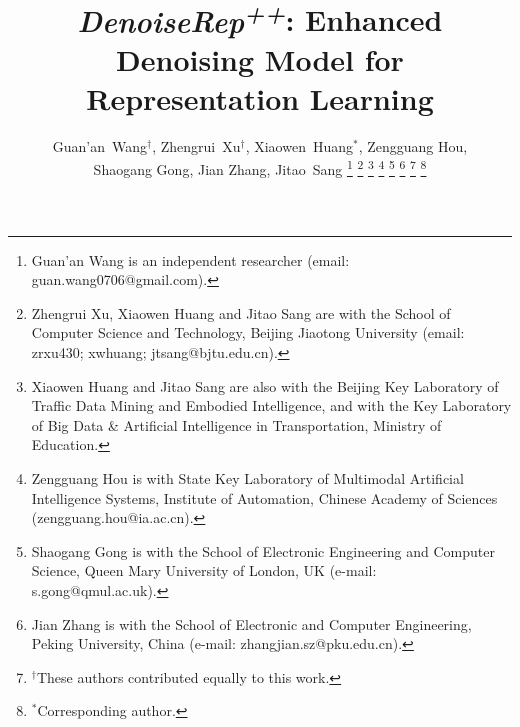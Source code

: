 \documentclass[conference]{IEEEtran}
\begin{document}
\title{\textit{DenoiseRep\textsuperscript{++}}: Enhanced Denoising Model for\\ Representation Learning\\}


\author{Guan'an~Wang$^{\dagger}$,
        Zhengrui~Xu$^{\dagger}$,
        Xiaowen~Huang$^{\ast}$,
        Zengguang Hou,\\
        Shaogang Gong,
        Jian Zhang,
        Jitao~Sang
\thanks{Guan’an Wang is an independent researcher (email: guan.wang0706@gmail.com).}%
\thanks{Zhengrui Xu, Xiaowen Huang and Jitao Sang are with the School of Computer Science and Technology, Beijing Jiaotong University (email: {zrxu430; xwhuang; jtsang}@bjtu.edu.cn).}%
\thanks{Xiaowen Huang and Jitao Sang are also with the Beijing Key Laboratory of Traffic Data Mining and Embodied Intelligence, and with the Key Laboratory of Big Data \& Artificial Intelligence in Transportation, Ministry of Education.}%
\thanks{Zengguang Hou is with State Key Laboratory of Multimodal Artificial Intelligence Systems, Institute of Automation, Chinese Academy of Sciences (zengguang.hou@ia.ac.cn).}%
\thanks{Shaogang Gong is with the School of Electronic Engineering and Computer Science, Queen Mary University of London, UK (e-mail: s.gong@qmul.ac.uk).}%
\thanks{Jian Zhang is with the School of Electronic and Computer Engineering, Peking University, China (e-mail: zhangjian.sz@pku.edu.cn).}%
\thanks{$^\dagger$These authors contributed equally to this work.}%
\thanks{$^\ast$Corresponding author.}%
}


\maketitle
\end{document}
